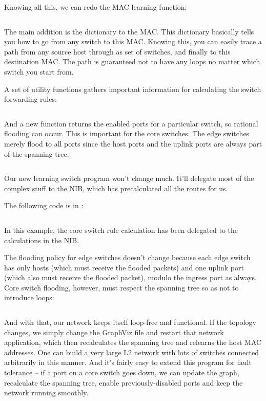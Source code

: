 Knowing all this, we can redo the MAC learning function:

\inputminted[firstline=116,lastline=148]{python}{code/multiswitch_topologies/network_information_base_from_file.py}

The main addition is the  dictionary to the MAC.   This dictionary basically tells you how to
go from any switch to this MAC.  Knowing this, you can easily trace a path from any source host through as set
of switches, and finally to this destination MAC.  The path is guaranteed not to have any loops no matter
which switch you start from.  

A set of utility functions gathers important information for calculating the switch 
forwarding rules:

\inputminted[firstline=95,lastline=115]{python}{code/multiswitch_topologies/network_information_base_from_file.py}

And a new function returns the enabled ports for a particular switch, so rational flooding can occur.
This is important for the core switches.  The edge switches merely flood to all ports since the host ports
and the uplink ports are always part of the spanning tree.   

\inputminted[firstline=194,lastline=196]{python}{code/multiswitch_topologies/network_information_base_from_file.py}

Our new learning switch program won't change much.  It'll delegate most of the complex stuff to the 
NIB, which has precalculated all the routes for us.  

The following code is in :

\inputminted[firstline=60,lastline=68]{python}{code/multiswitch_topologies/multiswitch3.py}

In this example, the core switch rule calculation has been delegated to the  calculations in
the NIB.  

The flooding policy for edge switches doesn't change because each edge switch has only hosts (which must
receive the flooded packets) and one uplink port (which also must receive the flooded packet), modulo the
ingress port as always.  Core switch flooding, however, must respect the spanning tree so as not to
introduce loops:

\inputminted[firstline=22,lastline=24]{python}{code/multiswitch_topologies/multiswitch3.py}

And with that, our network keeps itself loop-free and functional.  If the topology changes, we simply
change the GraphViz file and restart that network application, which then recalculates the spanning
tree and relearns the host MAC addresses.  One can build a very large L2 network with lots of 
switches connected arbitrarily in this manner.  And it's fairly easy to extend this program for fault
tolerance -- if a port on a core switch goes down, we can update the graph, recalculate the spanning
tree, enable previously-disabled ports and keep the network running smoothly.  

